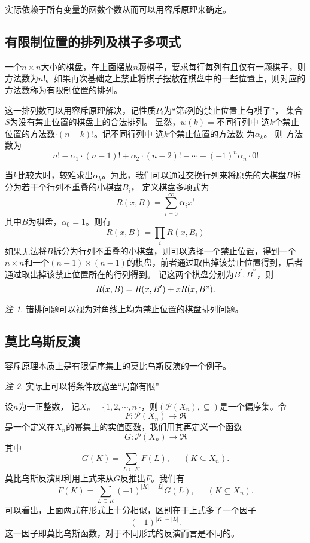\documentclass[a4paper,11pt]{article}%
\theoremstyle{remark}
\newtheorem*{remark}{注}
\theoremstyle{remark}
\theoremstyle{definition}
\theoremstyle{definition}
\theoremstyle{definition}
\newcommand*{\abs}[1]{\lvert #1 \rvert}
\begin{document}
    实际依赖于所有变量的函数个数从而可以用容斥原理来确定。
    
\subsection{有限制位置的排列及棋子多项式}
一个$n\times n$大小的棋盘，在上面摆放$n$颗棋子，要求每行每列有且仅有一颗棋子，则方法数为$n!$。如果再次基础之上禁止将棋子摆放在棋盘中的一些位置上，则对应的方法数称为有限制位置的排列。

这一排列数可以用容斥原理解决，记性质$P_i$为“第$i$列的禁止位置上有棋子”， 集合$S$为没有禁止位置的棋盘上的合法排列。
显然，$w(k)=$不同行列中 选$k$个禁止位置的方法数$\cdot(n-k)!$。记不同行列中 选$k$个禁止位置的方法数 为$\alpha_k$。
则 方法数为
\[n!-\alpha_1\cdot (n-1)!+\alpha_2\cdot(n-2)!-\cdots +(-1)^n\alpha_n \cdot 0!\]

当$k$比较大时，较难求出$\alpha_k$。为此，我们可以通过交换行列来将原先的大棋盘$B$拆分为若干个行列不重叠的小棋盘$B_i$，
定义棋盘多项式为
 \[R(x,B)=\sum_{i=0}^{\infty}\bm{\alpha}_ix^i\]
 其中$B$为棋盘，$\alpha_0=1$。则有 
 \[R(x,B)=\prod_iR(x,B_i)\]
 如果无法将$B$拆分为行列不重叠的小棋盘，则可以选择一个禁止位置，得到一个$n\times n$和一个$(n-1)\times (n-1)$的棋盘，前者通过取出掉该禁止位置得到，后者通过取出掉该禁止位置所在的行列得到。
 记这两个棋盘分别为$B^{\prime},B^{\prime\prime}$，则 
 \[R(x,B)=R(x,B')+xR(x,B").\]
\begin{remark}
    错排问题可以视为对角线上均为禁止位置的棋盘排列问题。
\end{remark}
\subsection{莫比乌斯反演}
容斥原理本质上是有限偏序集上的莫比乌斯反演的一个例子。
\begin{remark}
    实际上可以将条件放宽至“局部有限”
\end{remark}
设$n$为一正整数， 记$X_n=\{1,2,\cdots,n\}$，则$(\mathcal{P}(X_n),\subseteq)$是一个偏序集。令
\[F:\mathcal{P}(X_n)\rightarrow\mathfrak{R}\]
是一个定义在$X_n$的幂集上的实值函数，我们用其再定义一个函数
\[G:\mathcal{P}(X_n)\rightarrow \mathfrak{R}\]
其中 
\[G(K)=\sum_{L\subseteq K}F(L),\phantom{111}(K\subseteq X_n).\]
莫比乌斯反演即利用上式来从$G$反推出$F$。我们有
\[F(K)=\sum_{L\subseteq K}(-1)^{\abs{K}-\abs{L}}G(L),\phantom{111}(K\subseteq X_n).\]
可以看出，上面两式在形式上十分相似，区别在于上式多了一个因子 
\[(-1)^{\abs{K}-\abs{L}}.\]
这一因子即莫比乌斯函数，对于不同形式的反演而言是不同的。
\end{document}
